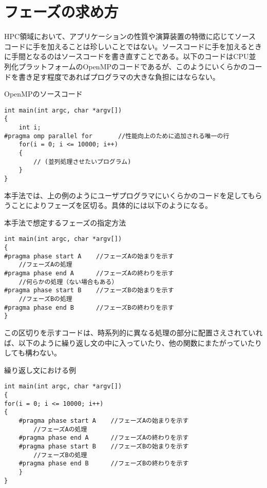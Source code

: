 \section{フェーズの求め方}
\label{sec:phase2}

HPC領域において、アプリケーションの性質や演算装置の特徴に応じてソースコードに手を加えることは珍しいことではない。ソースコードに手を加えるときに手間となるのはソースコードを書き直すことである。以下のコードはCPU並列化プラットフォームのOpenMPのコードであるが、このようにいくらかのコードを書き足す程度であればプログラマの大きな負担にはならない。

{\small
\begin{itembox}[c]{OpenMPのソースコード}
\begin{verbatim}
int main(int argc, char *argv[])
{
    int i;
#pragma omp parallel for       //性能向上のために追加される唯一の行
    for(i = 0; i <= 10000; i++)
    {
        // (並列処理させたいプログラム)
    }
}
\end{verbatim}
\end{itembox}}

本手法では、上の例のようにユーザプログラマにいくらかのコードを足してもらうことによりフェーズを区切る。具体的には以下のようになる。

{\small
\begin{itembox}[c]{本手法で想定するフェーズの指定方法}
\begin{verbatim}
int main(int argc, char *argv[])
{
#pragma phase start A    //フェーズAの始まりを示す
    //フェーズAの処理
#pragma phase end A      //フェーズAの終わりを示す
    //何らかの処理（ない場合もある）
#pragma phase start B    //フェーズBの始まりを示す
    //フェーズBの処理
#pragma phase end B      //フェーズBの終わりを示す
}
\end{verbatim}
\end{itembox}}

この区切りを示すコードは、時系列的に異なる処理の部分に配置さえされていれば、以下のように繰り返し文の中に入っていたり、他の関数にまたがっていたりしても構わない。

{\small
\begin{itembox}[c]{繰り返し文における例}
\begin{verbatim}
int main(int argc, char *argv[])
{
for(i = 0; i <= 10000; i++)
{
    #pragma phase start A    //フェーズAの始まりを示す
        //フェーズAの処理
    #pragma phase end A      //フェーズAの終わりを示す
    #pragma phase start B    //フェーズBの始まりを示す
        //フェーズBの処理
    #pragma phase end B      //フェーズBの終わりを示す
    }
}
\end{verbatim}
\end{itembox}}

